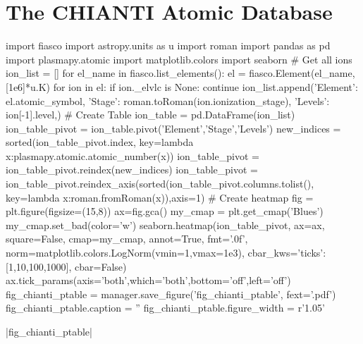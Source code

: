 \documentclass[12pt,aspectratio=169]{beamer}
\begin{document}
\section{The CHIANTI Atomic Database}
\begin{frame}[fragile]
    \begin{pycode}[manager]
import fiasco
import astropy.units as u
import roman
import pandas as pd
import plasmapy.atomic
import matplotlib.colors
import seaborn
# Get all ions
ion_list = []
for el_name in fiasco.list_elements():
    el = fiasco.Element(el_name,[1e6]*u.K)
    for ion in el:
        if ion._elvlc is None:
            continue
        ion_list.append({'Element': el.atomic_symbol,
                         'Stage': roman.toRoman(ion.ionization_stage),
                         'Levels': ion[-1].level,})
# Create Table
ion_table = pd.DataFrame(ion_list)
ion_table_pivot = ion_table.pivot('Element','Stage','Levels')
new_indices = sorted(ion_table_pivot.index, key=lambda x:plasmapy.atomic.atomic_number(x))
ion_table_pivot = ion_table_pivot.reindex(new_indices)
ion_table_pivot = ion_table_pivot.reindex_axis(sorted(ion_table_pivot.columns.tolist(),
                                                      key=lambda x:roman.fromRoman(x)),axis=1)
# Create heatmap
fig = plt.figure(figsize=(15,8))
ax=fig.gca()
my_cmap = plt.get_cmap('Blues')
my_cmap.set_bad(color='w')
seaborn.heatmap(ion_table_pivot,
                ax=ax,
                square=False,
                cmap=my_cmap,
                annot=True,
                fmt='.0f',
                norm=matplotlib.colors.LogNorm(vmin=1,vmax=1e3),
                cbar_kws={'ticks':[1,10,100,1000]},
                cbar=False)
ax.tick_params(axis='both',which='both',bottom='off',left='off')
fig_chianti_ptable = manager.save_figure('fig_chianti_ptable', fext='.pdf')
fig_chianti_ptable.caption = ''
fig_chianti_ptable.figure_width = r'1.05\textwidth'
    \end{pycode}
    \py[manager]|fig_chianti_ptable|
\end{frame}
\end{document}
